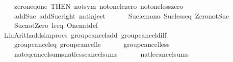 \begin{isabellebody}
\ \ \ \ \ \ zero{\isacharunderscore}{\kern0pt}neq{\isacharunderscore}{\kern0pt}one\ {\isacharbrackleft}{\kern0pt}THEN\ not{\isacharunderscore}{\kern0pt}sym{\isacharbrackright}{\kern0pt}\ not{\isacharunderscore}{\kern0pt}one{\isacharunderscore}{\kern0pt}le{\isacharunderscore}{\kern0pt}zero\ not{\isacharunderscore}{\kern0pt}one{\isacharunderscore}{\kern0pt}less{\isacharunderscore}{\kern0pt}zero\isanewline
\ \ \ \ \ \ add{\isacharunderscore}{\kern0pt}Suc\ add{\isacharunderscore}{\kern0pt}Suc{\isacharunderscore}{\kern0pt}right\ nat{\isachardot}{\kern0pt}inject\isanewline
\ \ \ \ \ \ Suc{\isacharunderscore}{\kern0pt}le{\isacharunderscore}{\kern0pt}mono\ Suc{\isacharunderscore}{\kern0pt}less{\isacharunderscore}{\kern0pt}eq\ Zero{\isacharunderscore}{\kern0pt}not{\isacharunderscore}{\kern0pt}Suc\isanewline
\ \ \ \ \ \ Suc{\isacharunderscore}{\kern0pt}not{\isacharunderscore}{\kern0pt}Zero\ le{\isacharunderscore}{\kern0pt}{}{\isacharunderscore}{\kern0pt}eq\ One{\isacharunderscore}{\kern0pt}nat{\isacharunderscore}{\kern0pt}def{\isacharbraceright}{\kern0pt}\isanewline
\ \ {\isacharhash}{\kern0pt}{\isachargreater}{\kern0pt}\ Lin{\isacharunderscore}{\kern0pt}Arith{\isachardot}{\kern0pt}add{\isacharunderscore}{\kern0pt}simprocs\ {\isacharbrackleft}{\kern0pt}\isactrlsimproc {\isasymopen}group{\isacharunderscore}{\kern0pt}cancel{\isacharunderscore}{\kern0pt}add{\isasymclose}{\isacharcomma}{\kern0pt}\ \isactrlsimproc {\isasymopen}group{\isacharunderscore}{\kern0pt}cancel{\isacharunderscore}{\kern0pt}diff{\isasymclose}{\isacharcomma}{\kern0pt}\isanewline
\ \ \ \ \ \ \isactrlsimproc {\isasymopen}group{\isacharunderscore}{\kern0pt}cancel{\isacharunderscore}{\kern0pt}eq{\isasymclose}{\isacharcomma}{\kern0pt}\ \isactrlsimproc {\isasymopen}group{\isacharunderscore}{\kern0pt}cancel{\isacharunderscore}{\kern0pt}le{\isasymclose}{\isacharcomma}{\kern0pt}\isanewline
\ \ \ \ \ \ \isactrlsimproc {\isasymopen}group{\isacharunderscore}{\kern0pt}cancel{\isacharunderscore}{\kern0pt}less{\isasymclose}{\isacharcomma}{\kern0pt}\isanewline
\ \ \ \ \ \ \isactrlsimproc {\isasymopen}nateq{\isacharunderscore}{\kern0pt}cancel{\isacharunderscore}{\kern0pt}sums{\isasymclose}{\isacharcomma}{\kern0pt}\isactrlsimproc {\isasymopen}natless{\isacharunderscore}{\kern0pt}cancel{\isacharunderscore}{\kern0pt}sums{\isasymclose}{\isacharcomma}{\kern0pt}\isanewline
\ \ \ \ \ \ \isactrlsimproc {\isasymopen}natle{\isacharunderscore}{\kern0pt}cancel{\isacharunderscore}{\kern0pt}sums{\isasymclose}{\isacharbrackright}{\kern0pt}{\isacharparenright}{\kern0pt}{\isacartoucheclose}\isanewline
\isanewline
{}\isamarkupfalse%

\end{isabellebody}
